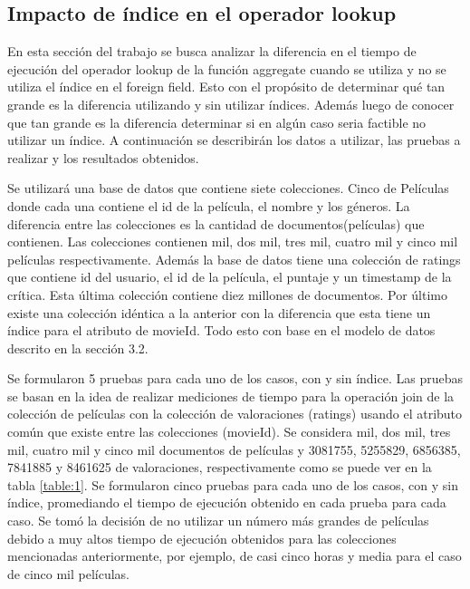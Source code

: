 \documentclass[conference,compsoc]{sty/IEEEtran}
\begin{document}
\subsection{Impacto de índice en el operador lookup}
En esta sección del trabajo se busca analizar la diferencia en el tiempo de ejecución del operador lookup de la función aggregate cuando se utiliza y no se utiliza el índice en el foreign field. Esto con el propósito de determinar qué tan grande es la diferencia utilizando y sin utilizar índices. Además luego de conocer que tan grande es la diferencia determinar si en algún caso seria factible no utilizar un índice. A continuación se describirán los datos a utilizar, las pruebas a realizar y los resultados obtenidos.

Se utilizará una base de datos que contiene siete colecciones. Cinco de Películas donde cada una contiene el id de la película, el nombre y los géneros. La diferencia entre las colecciones es la cantidad de documentos(películas) que contienen. Las colecciones contienen mil, dos mil, tres mil, cuatro mil y cinco mil películas respectivamente. Además la base de datos tiene una colección de ratings que contiene id del usuario, el id de la película, el puntaje y un timestamp de la crítica. Esta última colección contiene diez millones de documentos. Por último existe una colección idéntica a la anterior con la diferencia que esta tiene un índice para el atributo de movieId. Todo esto con base en el modelo de datos descrito en la sección 3.2.

Se formularon 5 pruebas para cada uno de los casos, con y sin índice. Las pruebas se basan en la idea de realizar mediciones de tiempo para la operación join de la colección de películas con la colección de valoraciones (ratings) usando el atributo común que existe entre las colecciones (movieId). Se considera  mil, dos mil, tres mil, cuatro mil y cinco mil documentos de películas y 3081755, 5255829, 6856385, 7841885 y 8461625 de valoraciones, respectivamente como se puede ver en la tabla \ref{table:1}. Se formularon cinco pruebas para cada uno de los casos, con y sin índice, promediando el tiempo de ejecución obtenido en cada prueba para cada caso. Se tomó la decisión de no utilizar un número más grandes de películas debido a muy altos tiempo de ejecución obtenidos para las colecciones mencionadas anteriormente, por ejemplo, de casi cinco horas y media para el caso de cinco mil películas. 
\end{document}
